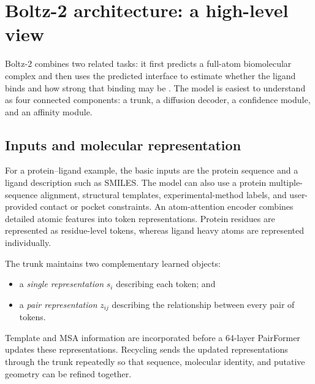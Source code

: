\section{Boltz-2 architecture: a high-level view}

Boltz-2 combines two related tasks: it first predicts a full-atom
biomolecular complex and then uses the predicted interface to estimate whether
the ligand binds and how strong that binding may be \citep{passaro2025boltz2}.
The model is easiest to understand as four connected components: a trunk, a
diffusion decoder, a confidence module, and an affinity module.

\begin{center}
\end{center}

\subsection{Inputs and molecular representation}

For a protein--ligand example, the basic inputs are the protein sequence and a
ligand description such as SMILES. The model can also use a protein
multiple-sequence alignment, structural templates, experimental-method labels,
and user-provided contact or pocket constraints. An atom-attention encoder
combines detailed atomic features into token representations. Protein residues
are represented as residue-level tokens, whereas ligand heavy atoms are
represented individually.

The trunk maintains two complementary learned objects:

\begin{itemize}
  \item a \emph{single representation} $s_i$ describing each token; and
  \item a \emph{pair representation} $z_{ij}$ describing the relationship
        between every pair of tokens.
\end{itemize}

Template and MSA information are incorporated before a 64-layer PairFormer
updates these representations. Recycling sends the updated representations
through the trunk repeatedly so that sequence, molecular identity, and
putative geometry can be refined together.

